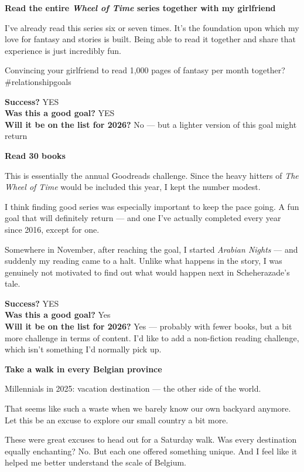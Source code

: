 \documentclass[12pt]{article}
\begin{document}
\textbf{Read the entire \emph{Wheel of Time} series together with my
girlfriend}

I've already read this series six or seven times. It's the foundation
upon which my love for fantasy and stories is built. Being able to read
it together and share that experience is just incredibly fun.

Convincing your girlfriend to read 1,000 pages of fantasy per month
together?\\
\#relationshipgoals

\textbf{Success?} YES\\
\textbf{Was this a good goal?} YES\\
\textbf{Will it be on the list for 2026?} No --- but a lighter version
of this goal might return

\textbf{Read 30 books}

This is essentially the annual Goodreads challenge. Since the heavy
hitters of \emph{The Wheel of Time} would be included this year, I kept
the number modest.

I think finding good series was especially important to keep the pace
going. A fun goal that will definitely return --- and one I've actually
completed every year since 2016, except for one.

Somewhere in November, after reaching the goal, I started \emph{Arabian
Nights} --- and suddenly my reading came to a halt. Unlike what happens
in the story, I was genuinely not motivated to find out what would
happen next in Scheherazade's tale.

\textbf{Success?} YES\\
\textbf{Was this a good goal?} Yes\\
\textbf{Will it be on the list for 2026?} Yes --- probably with fewer
books, but a bit more challenge in terms of content. I'd like to add a
non-fiction reading challenge, which isn't something I'd normally pick
up.

\textbf{Take a walk in every Belgian province}

Millennials in 2025: vacation destination --- the other side of the
world.

That seems like such a waste when we barely know our own backyard
anymore. Let this be an excuse to explore our small country a bit more.

These were great excuses to head out for a Saturday walk. Was every
destination equally enchanting? No. But each one offered something
unique. And I feel like it helped me better understand the scale of
Belgium.
\end{document}
